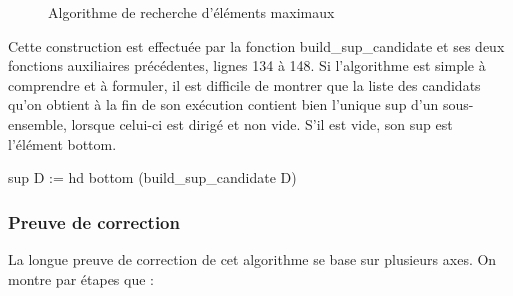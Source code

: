 \documentclass{article}
\newcommand\code[1]{{\fontfamily{lmtt}\selectfont #1}}
\theoremstyle{definition}
\begin{document}
\begin{figure}[ht]
{
	}
\caption{Algorithme de recherche d'éléments maximaux}
\end{figure}


Cette construction est effectuée par la fonction \code{build\_sup\_candidate} et ses deux fonctions auxiliaires précédentes, lignes 134 à 148. Si l'algorithme est simple à comprendre et à formuler, il est difficile de montrer que la liste des candidats qu'on obtient à la fin de son exécution contient bien l'unique sup d'un sous-ensemble, lorsque celui-ci est dirigé et non vide. S'il est vide, son sup est l'élément bottom.

\begin{coq}
sup D := hd bottom (build_sup_candidate D)
\end{coq}


\subsubsection{Preuve de correction}

La longue preuve de correction de cet algorithme se base sur plusieurs axes. On montre par étapes que :
\end{document}
